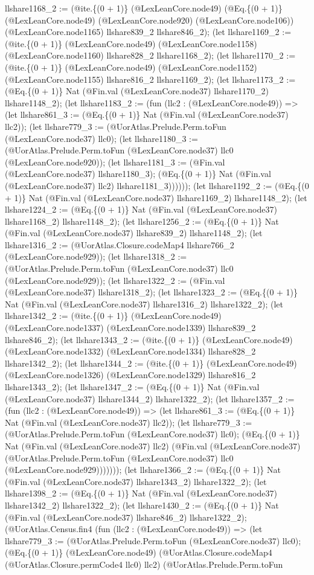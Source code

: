 \documentclass[11pt]{article}
\begin{document}
llshare1168\_2 := (@ite.\{(0 + 1)\} (@LexLeanCore.node49) (@Eq.\{(0 + 1)\} (@LexLeanCore.node49) (@LexLeanCore.node920) (@LexLeanCore.node106)) (@LexLeanCore.node1165) llshare839\_2 llshare846\_2); (let llshare1169\_2 := (@ite.\{(0 + 1)\} (@LexLeanCore.node49) (@LexLeanCore.node1158) (@LexLeanCore.node1160) llshare828\_2 llshare1168\_2); (let llshare1170\_2 := (@ite.\{(0 + 1)\} (@LexLeanCore.node49) (@LexLeanCore.node1152) (@LexLeanCore.node1155) llshare816\_2 llshare1169\_2); (let llshare1173\_2 := (@Eq.\{(0 + 1)\} Nat (@Fin.val (@LexLeanCore.node37) llshare1170\_2) llshare1148\_2); (let llshare1183\_2 := (fun (llc2 : (@LexLeanCore.node49)) => (let llshare861\_3 := (@Eq.\{(0 + 1)\} Nat (@Fin.val (@LexLeanCore.node37) llc2)); (let llshare779\_3 := (@UorAtlas.Prelude.Perm.toFun (@LexLeanCore.node37) llc0); (let llshare1180\_3 := (@UorAtlas.Prelude.Perm.toFun (@LexLeanCore.node37) llc0 (@LexLeanCore.node920)); (let llshare1181\_3 := (@Fin.val (@LexLeanCore.node37) llshare1180\_3); (@Eq.\{(0 + 1)\} Nat (@Fin.val (@LexLeanCore.node37) llc2) llshare1181\_3)))))); (let llshare1192\_2 := (@Eq.\{(0 + 1)\} Nat (@Fin.val (@LexLeanCore.node37) llshare1169\_2) llshare1148\_2); (let llshare1224\_2 := (@Eq.\{(0 + 1)\} Nat (@Fin.val (@LexLeanCore.node37) llshare1168\_2) llshare1148\_2); (let llshare1256\_2 := (@Eq.\{(0 + 1)\} Nat (@Fin.val (@LexLeanCore.node37) llshare839\_2) llshare1148\_2); (let llshare1316\_2 := (@UorAtlas.Closure.codeMap4 llshare766\_2 (@LexLeanCore.node929)); (let llshare1318\_2 := (@UorAtlas.Prelude.Perm.toFun (@LexLeanCore.node37) llc0 (@LexLeanCore.node929)); (let llshare1322\_2 := (@Fin.val (@LexLeanCore.node37) llshare1318\_2); (let llshare1323\_2 := (@Eq.\{(0 + 1)\} Nat (@Fin.val (@LexLeanCore.node37) llshare1316\_2) llshare1322\_2); (let llshare1342\_2 := (@ite.\{(0 + 1)\} (@LexLeanCore.node49) (@LexLeanCore.node1337) (@LexLeanCore.node1339) llshare839\_2 llshare846\_2); (let llshare1343\_2 := (@ite.\{(0 + 1)\} (@LexLeanCore.node49) (@LexLeanCore.node1332) (@LexLeanCore.node1334) llshare828\_2 llshare1342\_2); (let llshare1344\_2 := (@ite.\{(0 + 1)\} (@LexLeanCore.node49) (@LexLeanCore.node1326) (@LexLeanCore.node1329) llshare816\_2 llshare1343\_2); (let llshare1347\_2 := (@Eq.\{(0 + 1)\} Nat (@Fin.val (@LexLeanCore.node37) llshare1344\_2) llshare1322\_2); (let llshare1357\_2 := (fun (llc2 : (@LexLeanCore.node49)) => (let llshare861\_3 := (@Eq.\{(0 + 1)\} Nat (@Fin.val (@LexLeanCore.node37) llc2)); (let llshare779\_3 := (@UorAtlas.Prelude.Perm.toFun (@LexLeanCore.node37) llc0); (@Eq.\{(0 + 1)\} Nat (@Fin.val (@LexLeanCore.node37) llc2) (@Fin.val (@LexLeanCore.node37) (@UorAtlas.Prelude.Perm.toFun (@LexLeanCore.node37) llc0 (@LexLeanCore.node929))))))); (let llshare1366\_2 := (@Eq.\{(0 + 1)\} Nat (@Fin.val (@LexLeanCore.node37) llshare1343\_2) llshare1322\_2); (let llshare1398\_2 := (@Eq.\{(0 + 1)\} Nat (@Fin.val (@LexLeanCore.node37) llshare1342\_2) llshare1322\_2); (let llshare1430\_2 := (@Eq.\{(0 + 1)\} Nat (@Fin.val (@LexLeanCore.node37) llshare846\_2) llshare1322\_2); (@UorAtlas.Census.fin4 (fun (llc2 : (@LexLeanCore.node49)) => (let llshare779\_3 := (@UorAtlas.Prelude.Perm.toFun (@LexLeanCore.node37) llc0); (@Eq.\{(0 + 1)\} (@LexLeanCore.node49) (@UorAtlas.Closure.codeMap4 (@UorAtlas.Closure.permCode4 llc0) llc2) (@UorAtlas.Prelude.Perm.toFun 
\end{document}
